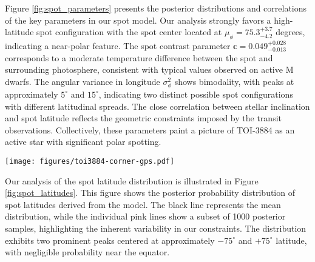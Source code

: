\documentclass[twocolumn]{aastex631}
\begin{document}
Figure \ref{fig:spot_parameters} presents the posterior distributions and correlations of the key parameters in our spot model. 
Our analysis strongly favors a high-latitude spot configuration with the spot center located at $\mu_{\phi} = {75.3}^{+3.7}_{-4.2}$ 
degrees, indicating a near-polar feature. The spot contrast parameter $\mathbb{c} = 0.049^{+0.028}_{-0.013}$ corresponds to a 
moderate temperature difference between the spot and surrounding photosphere, consistent with typical values observed on active M 
dwarfs. The angular variance in longitude $\sigma^2_{\phi}$ shows bimodality, with peaks at approximately $5^{\circ}$ 
and $15^{\circ}$, indicating two distinct possible spot configurations with different latitudinal spreads. 
The close correlation between stellar inclination and spot latitude reflects the geometric constraints imposed by the transit 
observations. Collectively, these parameters paint a picture of TOI-3884 as an active star with significant polar spotting.

\begin{figure*}[hbt!]
    \centering
    \texttt{[image: figures/toi3884-corner-gps.pdf]}
    \caption{Corner plot showing the posterior distributions and correlations for the spot model parameters. 
    The diagonal panels display the marginalized posterior distributions for each parameter: the spot size 
    $\mathcal{r}$ ($^{\circ}$), spot contrast $\mathcal{c}$, number of spots $\mathcal{n}$, spot latitude $\mu_{\phi}$ ($^{\circ}$), 
    and the angular variance in latitude $\sigma^2_{\phi}$ ($^{\circ}$). The spot latitude is concentrated at high values around 
    $75^{\circ}$--$80^{\circ}$, 
    confirming the presence of a near-polar spot. The spot contrast is relatively modest with most of the probability mass below
     0.1. The number of spots tends toward values between 7.5 and 10, suggesting a relatively small number of spots.}
    \label{fig:spot_parameters}
\end{figure*}

Our analysis of the spot latitude distribution is illustrated in Figure \ref{fig:spot_latitudes}. This figure shows the posterior 
probability distribution of spot latitudes derived from the model. The black line represents the mean distribution, 
while the individual pink lines show a subset of 1000 posterior samples, highlighting the inherent variability in our constraints. 
The distribution exhibits two prominent peaks centered at approximately $-75^{\circ}$ and $+75^{\circ}$ latitude, 
with negligible probability near the equator.
\end{document}
